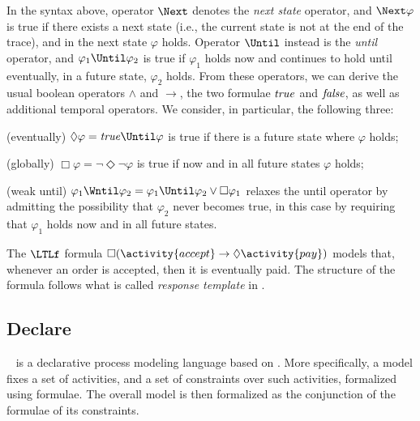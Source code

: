 In the syntax above, operator $\Next$ denotes the \emph{next state} operator, and $\Next \varphi$ is true if there exists a next state (i.e., the current state is not at the end of the trace), and in the next state $\varphi$ holds. Operator $\Until$ instead is the \emph{until} operator, and $\varphi_1\Until\varphi_2$ is true if $\varphi_1$ holds now and continues to hold until eventually, in a future state, $\varphi_2$ holds. From these operators, we can derive the usual boolean operators $\land$ and $\rightarrow$, the two formulae $\mathit{true}$ and $\mathit{false}$, as well as additional temporal operators. We consider, in particular, the following three:
\begin{compactitem}[$\bullet$]
\item (eventually) $\Diamond \varphi = \true \Until \varphi$ is true if there is a future state where $\varphi$ holds;
\item (globally) $\Box \varphi = \neg \Diamond \neg \varphi$ is true if now and in all future states $\varphi$ holds;
\item (weak until) $\varphi_1 \Wntil \varphi_2 = \varphi_1\Until\varphi_2 \lor \Box \varphi_1$ relaxes the until operator by admitting the possibility that $\varphi_2$ never becomes true, in this case by requiring that $\varphi_1$ holds now and in all future states.
\end{compactitem}

\begin{example}
The $\LTLf$ formula $\Box(\activity{accept} \rightarrow \Diamond\activity{pay})$ models that, whenever an order is accepted, then it is eventually paid. The structure of the formula follows what is called \emph{response template} in \declare.
\end{example}


\subsection{Declare}

\declare\ \cite{PeSV07} is a declarative process modeling language based on \LTLf. More specifically, a \declare model fixes a set of activities, and a set of constraints over such activities, formalized using \LTLf formulae. The overall model is then formalized as the conjunction of the \LTLf formulae of its constraints.

